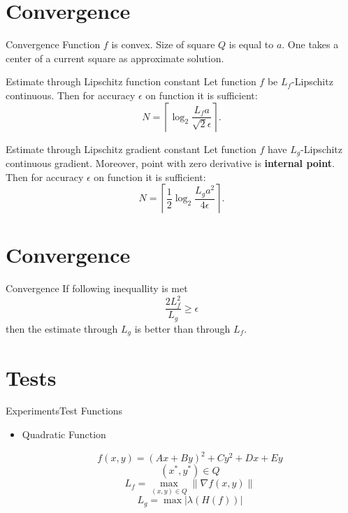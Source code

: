 \documentclass{beamer}
\begin{document}
\section{Convergence}

\begin{frame}{Convergence}
Function $f$ is convex. Size of square $Q$ is equal to $a$. One takes a center of a current square as approximate  solution.
\begin{block}{Estimate through Lipschitz function constant}
Let function $f$ be $L_f$-Lipschitz continuous. Then for accuracy $\epsilon$ on function it is sufficient:
\begin{equation}\label{NI1}N = \left\lceil\log_2\frac{L_fa}{\sqrt{2}\epsilon}\right\rceil.\end{equation}
\end{block}
\pause
\begin{block}{Estimate through Lipschitz gradient constant}
Let function $f$ have $L_g$-Lipschitz continuous gradient. Moreover, point with zero derivative is  \textbf{internal point}. Then for accuracy $\epsilon$ on function it is sufficient:
\begin{equation}\label{NI3}N = \left\lceil\frac{1}{2}\log_2\frac{L_ga^2}{4\epsilon}\right\rceil.\end{equation}
\end{block}
\end{frame}

\section{Convergence}

\begin{frame}{Convergence}
If following inequallity is met
$$\frac{2L_f^2}{L_g} \geq \epsilon$$
then the estimate through $L_g$ is better than through $L_f$.
\end{frame}

\section{Tests}

\begin{frame}{Experiments}{Test Functions}

\begin{itemize}
\item{Quadratic Function

$$f(x,y) = (Ax+By)^2+Cy^2 + Dx+Ey$$
$$(x^*, y^*)\in Q$$
$$L_f = \max\limits_{(x,y) \in Q}\|\nabla f(x, y)\|$$
$$L_g = \max |\lambda\left(H(f)\right)|$$
}
\end{itemize}
\end{frame}
\end{document}
